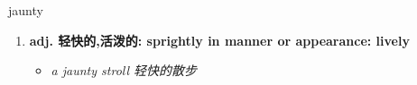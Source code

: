 
\begin{frame}
{\huge jaunty}
\begin{center}
\begin{enumerate}\Large
  \item \textbf{adj. 轻快的,活泼的: sprightly in manner or appearance: lively}
  \begin{itemize}
    \item \em{\Large{a jaunty stroll 轻快的散步}}
  \end{itemize}
\end{enumerate}
\end{center}
\end{frame}
